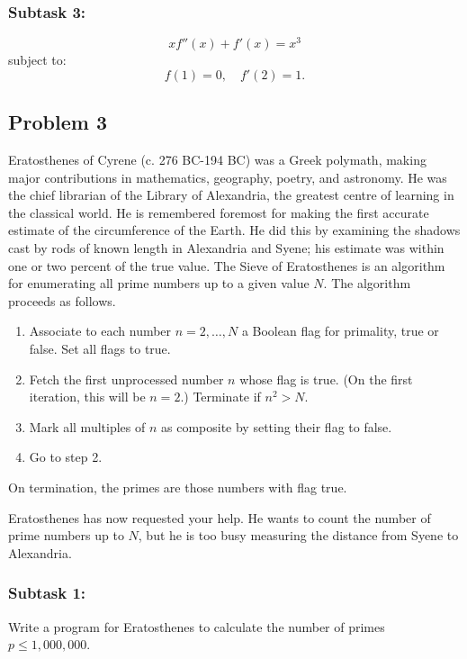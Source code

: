 \documentclass[12pt]{article}
\begin{document}
    \subsubsection*{\textbf{Subtask 3:}} 

    $$x f''(x) + f'(x) = x^3$$
    subject to:
$$
f(1) = 0, \quad f'(2) = 1.
$$

\newpage
\subsection{Problem 3}
Eratosthenes of Cyrene (c. 276 BC-194 BC) was a Greek polymath, making major contributions in mathematics, geography, poetry, and astronomy. He was the chief librarian of the Library of Alexandria, the greatest centre of learning in the classical world. He is remembered foremost for making the first accurate estimate of the circumference of the Earth. He did this by examining the shadows cast by rods of known length in Alexandria and Syene; his estimate was within one or two percent of the true value.
\vspace{1em}
The Sieve of Eratosthenes is an algorithm for enumerating all prime numbers up to a given value $N$. The algorithm proceeds as follows.
\vspace{1em}
\begin{enumerate}
    \item Associate to each number $n=2, \dots, N$ a Boolean flag for primality, true or false. Set all flags to true.
    \item Fetch the first unprocessed number $n$ whose flag is true. (On the first iteration, this will be $n=2$.) Terminate if $n^2 > N$.
    \item Mark all multiples of $n$ as composite by setting their flag to false.
    \item Go to step 2.
\end{enumerate}

On termination, the primes are those numbers with flag true.

Eratosthenes has now requested your help. He wants to count the number of prime numbers up to $N$, but he is too busy measuring the distance from Syene to Alexandria. 

\subsubsection*{\textbf{Subtask 1:}} 
Write a program for Eratosthenes to calculate the number of primes $p \leq 1,000,000$. 
\end{document}

